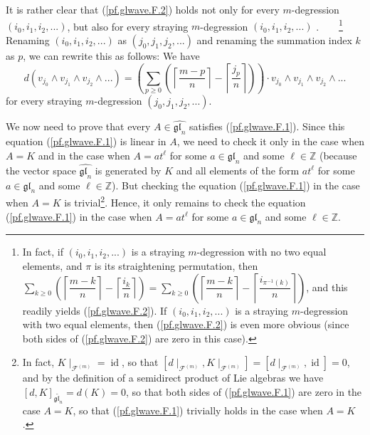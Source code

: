 \documentclass[etingof-lie.tex]{subfiles}
\begin{document}
It is rather clear that (\ref{pf.glwave.F.2}) holds not only for every
$m$-degression $\left(  i_{0},i_{1},i_{2},...\right)  $, but also for every
straying $m$-degression $\left(  i_{0},i_{1},i_{2},...\right)  $%
.\ \ \ \ \footnote{In fact, if $\left(  i_{0},i_{1},i_{2},...\right)  $ is a
straying $m$-degression with no two equal elements, and $\pi$ is its
straightening permutation, then $\sum\limits_{k\geq0}\left(  \left\lceil
\dfrac{m-k}{n}\right\rceil -\left\lceil \dfrac{i_{k}}{n}\right\rceil \right)
=\sum\limits_{k\geq0}\left(  \left\lceil \dfrac{m-k}{n}\right\rceil
-\left\lceil \dfrac{i_{\pi^{-1}\left(  k\right)  }}{n}\right\rceil \right)  $,
and this readily yields (\ref{pf.glwave.F.2}). If $\left(  i_{0},i_{1}%
,i_{2},...\right)  $ is a straying $m$-degression with two equal elements,
then (\ref{pf.glwave.F.2}) is even more obvious (since both sides of
(\ref{pf.glwave.F.2}) are zero in this case).} Renaming $\left(  i_{0}%
,i_{1},i_{2},...\right)  $ as $\left(  j_{0},j_{1},j_{2},...\right)  $ and
renaming the summation index $k$ as $p$, we can rewrite this as follows: We
have%
\begin{equation}
d\left(  v_{j_{0}}\wedge v_{j_{1}}\wedge v_{j_{2}}\wedge...\right)  =\left(
\sum\limits_{p\geq0}\left(  \left\lceil \dfrac{m-p}{n}\right\rceil
-\left\lceil \dfrac{j_{p}}{n}\right\rceil \right)  \right)  \cdot v_{j_{0}%
}\wedge v_{j_{1}}\wedge v_{j_{2}}\wedge... \label{pf.glwave.F.2stray}%
\end{equation}
for every straying $m$-degression $\left(  j_{0},j_{1},j_{2},...\right)  $.

We now need to prove that every $A\in\widehat{\mathfrak{gl}_{n}}$ satisfies
(\ref{pf.glwave.F.1}). Since this equation (\ref{pf.glwave.F.1}) is linear in
$A$, we need to check it only in the case when $A=K$ and in the case when
$A=at^{\ell}$ for some $a\in\mathfrak{gl}_{n}$ and some $\ell\in\mathbb{Z}$
(because the vector space $\widehat{\mathfrak{gl}_{n}}$ is generated by $K$
and all elements of the form $at^{\ell}$ for some $a\in\mathfrak{gl}_{n}$ and
some $\ell\in\mathbb{Z}$). But checking the equation (\ref{pf.glwave.F.1}) in
the case when $A=K$ is trivial\footnote{In fact, $K\mid_{\mathcal{F}^{\left(
m\right)  }}=\operatorname*{id}$, so that $\left[  d\mid_{\mathcal{F}^{\left(
m\right)  }},K\mid_{\mathcal{F}^{\left(  m\right)  }}\right]  =\left[
d\mid_{\mathcal{F}^{\left(  m\right)  }},\operatorname*{id}\right]  =0$, and
by the definition of a semidirect product of Lie algebras we have $\left[
d,K\right]  _{\widetilde{\mathfrak{gl}_{n}}}=d\left(  K\right)  =0$, so that
both sides of (\ref{pf.glwave.F.1}) are zero in the case $A=K$, so that
(\ref{pf.glwave.F.1}) trivially holds in the case when $A=K$.}. Hence, it only
remains to check the equation (\ref{pf.glwave.F.1}) in the case when
$A=at^{\ell}$ for some $a\in\mathfrak{gl}_{n}$ and some $\ell\in\mathbb{Z}$.
\end{document}
